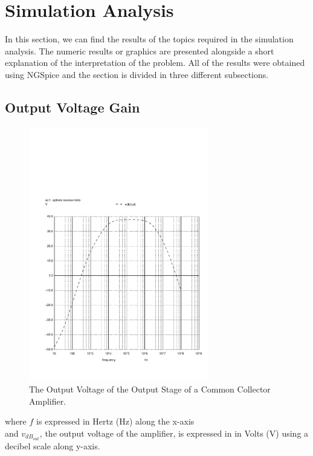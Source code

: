 \section{Simulation Analysis}
\label{sec:simulation}

In this section, we can find the results of the topics required in the simulation analysis. The numeric results or graphics are presented alongside a short explanation of the interpretation of the problem. All of the results were obtained using NGSpice and the section is divided in three different subsections. 

\subsection{Output Voltage Gain}

\begin{figure}[H]\centering
\includegraphics[trim= 0cm 0cm 0cm 10cm, clip, width=0.7\textwidth]{vo2f.pdf}
\caption{The Output Voltage of the Output Stage of a Common Collector Amplifier.}
\label{fig:sim_output}
\end{figure}

where $f$ is expressed in Hertz (Hz) along the x-axis\\
and $v_{dB_{out}}$, the output voltage of the amplifier, is expressed in  in Volts (V) using a decibel scale along y-axis.


